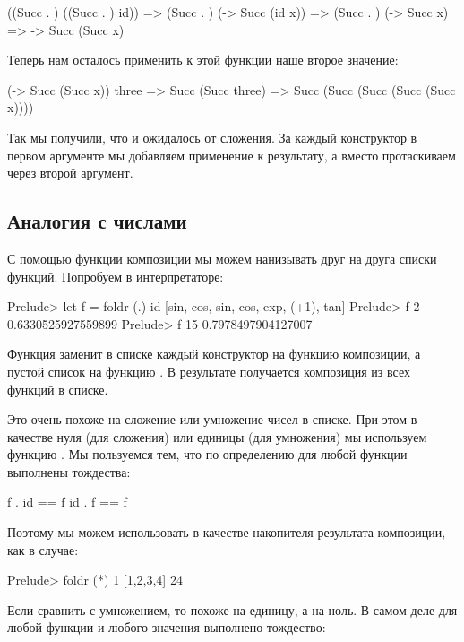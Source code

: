 \begin{code}
    ((Succ . ) ((Succ . ) id))
=>   (Succ . ) (\x -> Succ (id x))
=>   (Succ . ) (\x -> Succ x)
=>   \x -> Succ (Succ x)
\end{code}

Теперь нам осталось применить к этой функции наше второе
значение:

\begin{code}
    (\x -> Succ (Succ x)) three
=>  Succ (Succ three)
=>  Succ (Succ (Succ (Succ (Succ x))))
\end{code}

Так мы получили, что и ожидалось от сложения. За каждый
конструктор  в первом аргументе мы добавляем 
применение  к результату, а вместо 
протаскиваем через  второй аргумент. 

\subsection{Аналогия с числами}


С помощью функции композиции мы можем нанизывать
друг на друга списки функций. Попробуем в интерпретаторе: 

\begin{code}
Prelude> let f = foldr (.) id [sin, cos, sin, cos, exp, (+1), tan]
Prelude> f 2
0.6330525927559899
Prelude> f 15
0.7978497904127007
\end{code}

Функция  заменит в списке каждый конструктор  \In{(:)}
на функцию композиции, а пустой список на функцию . 
В результате получается композиция из всех функций в списке.

Это очень похоже на сложение или умножение чисел в списке.
При этом в качестве нуля (для сложения) или единицы (для умножения)
мы используем функцию . Мы пользуемся тем, что по
определению для любой функции  выполнены тождества:

\begin{code}
f  . id  ==  f
id . f   ==  f
\end{code}

Поэтому мы можем использовать  в качестве накопителя 
результата композиции, как в случае: 

\begin{code}
Prelude> foldr (*) 1 [1,2,3,4]
24
\end{code}

Если сравнить  с умножением, то  похоже
на единицу, а  на ноль. В самом деле для 
любой функции  и любого значения  выполнено
тождество:

